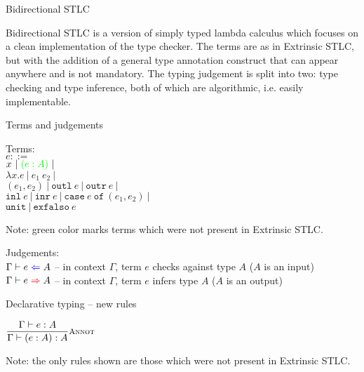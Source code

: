 \documentclass{beamer}
\newcommand{\pipe}{\ |\ }
\newcommand{\annot}[2]{(#1 : #2)}
\newcommand{\fun}[2]{\lambda #1. #2}
\newcommand{\app}[2]{#1\ #2}
\newcommand{\pair}[2]{(#1, #2)}
\newcommand{\outl}[1]{\texttt{outl}\ #1}
\newcommand{\outr}[1]{\texttt{outr}\ #1}
\newcommand{\inl}[1]{\texttt{inl}\ #1}
\newcommand{\inr}[1]{\texttt{inr}\ #1}
\newcommand{\case}[3]{\texttt{case}\ #1\ \texttt{of}\ (#2, #3)}
\newcommand{\unit}{\texttt{unit}}
\newcommand{\exfalso}[1]{\texttt{exfalso}\ #1}
\newcommand{\fulltyping}[3]{#1 \vdash #2 : #3}
\newcommand{\typing}[2]{\fulltyping{\Gamma}{#1}{#2}}
\newcommand{\rulename}[1]{\textsc{\footnotesize{#1}}}
\newcommand{\infrule}[3][]{\displaystyle \frac{#2}{#3} \rulename{#1}}
\begin{document}
\begin{frame}{Bidirectional STLC}

Bidirectional STLC is a version of simply typed lambda calculus which focuses on a clean implementation of the type checker. The terms are as in Extrinsic STLC, but with the addition of a general type annotation construct that can appear anywhere and is not mandatory. The typing judgement is split into two: type checking and type inference, both of which are algorithmic, i.e. easily implementable.

\end{frame}

\begin{frame}{Terms and judgements}

Terms: \\
$e ::=$ \\
\qquad $x \pipe \newterm{\annot{e}{A}} \pipe$ \\
\qquad $\fun{x}{e} \pipe \app{e_1}{e_2} \pipe$ \\
\qquad $\pair{e_1}{e_2} \pipe \outl{e} \pipe \outr{e} \pipe$ \\
\qquad $\inl{e} \pipe \inr{e} \pipe \case{e}{e_1}{e_2} \pipe$ \\
\qquad $\unit \pipe \exfalso{e}$

\vspace{2em}

Note: green color marks terms which were not present in Extrinsic STLC.

\vspace{2em}

Judgements: \\
$\fullcheck{\Gamma}{e}{A}$ -- in context $\Gamma$, term $e$ checks against type $A$ ($A$ is an input) \\
$\fullinfer{\Gamma}{e}{A}$ -- in context $\Gamma$, term $e$ infers type $A$ ($A$ is an output)

\end{frame}

\begin{frame}{Declarative typing -- new rules}

\begin{center}
  $\infrule[Annot]{\typing{e}{A}}{\typing{\annot{e}{A}}{A}}$
\end{center}

\vspace{2em}

Note: the only rules shown are those which were not present in Extrinsic STLC.

\end{frame}
\end{document}
